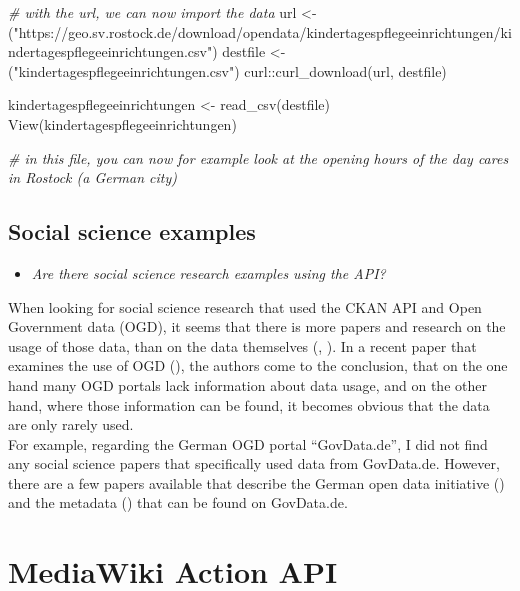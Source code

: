 \documentclass[
]{book}
\newenvironment{Shaded}{\begin{snugshade}}{\end{snugshade}}
\newcommand{\CommentTok}[1]{\textcolor[rgb]{0.56,0.35,0.01}{\textit{#1}}}
\newcommand{\FunctionTok}[1]{\textcolor[rgb]{0.00,0.00,0.00}{#1}}
\newcommand{\NormalTok}[1]{#1}
\newcommand{\OtherTok}[1]{\textcolor[rgb]{0.56,0.35,0.01}{#1}}
\newcommand{\SpecialCharTok}[1]{\textcolor[rgb]{0.00,0.00,0.00}{#1}}
\newcommand{\StringTok}[1]{\textcolor[rgb]{0.31,0.60,0.02}{#1}}
\providecommand{\tightlist}{%
  \setlength{\itemsep}{0pt}\setlength{\parskip}{0pt}}
\begin{document}
\begin{Shaded}
\begin{Highlighting}[]
\CommentTok{\# with the url, we can now import the data}
\NormalTok{url }\OtherTok{\textless{}{-}}\NormalTok{ (}\StringTok{"https://geo.sv.rostock.de/download/opendata/kindertagespflegeeinrichtungen/kindertagespflegeeinrichtungen.csv"}\NormalTok{)}
\NormalTok{destfile }\OtherTok{\textless{}{-}}\NormalTok{ (}\StringTok{"kindertagespflegeeinrichtungen.csv"}\NormalTok{)}
\NormalTok{curl}\SpecialCharTok{::}\FunctionTok{curl\_download}\NormalTok{(url, destfile)}

\NormalTok{kindertagespflegeeinrichtungen }\OtherTok{\textless{}{-}} \FunctionTok{read\_csv}\NormalTok{(destfile)}
\FunctionTok{View}\NormalTok{(kindertagespflegeeinrichtungen)}

\CommentTok{\# in this file, you can now for example look at the opening hours of the day cares in Rostock (a German city)}
\end{Highlighting}
\end{Shaded}

\hypertarget{social-science-examples-8}{%
\section{Social science examples}\label{social-science-examples-8}}

\begin{itemize}
\tightlist
\item
  \emph{Are there social science research examples using the API?}
\end{itemize}

When looking for social science research that used the CKAN API and Open Government data (OGD), it seems that there is more papers and research on the usage of those data, than on the data themselves (\citet{Bedini2014}, \citet{Correa2015}).
In a recent paper that examines the use of OGD (\citet{Quarati2019-jf}), the authors come to the conclusion, that on the one hand many OGD portals lack information about data usage, and on the other hand, where those information can be found, it becomes obvious that the data are only rarely used.\\
For example, regarding the German OGD portal ``GovData.de'', I did not find any social science papers that specifically used data from GovData.de. However, there are a few papers available that describe the German open data initiative (\citet{Liu2018}) and the metadata (\citet{Marienfeld2013}) that can be found on GovData.de.

\hypertarget{mediawiki-action-api}{%
\chapter{MediaWiki Action API}\label{mediawiki-action-api}}
\end{document}
